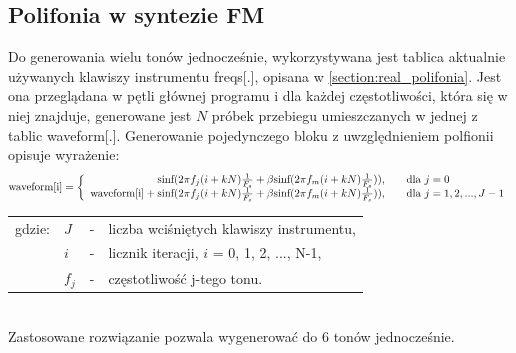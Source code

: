 \subsection{Polifonia w syntezie FM}
Do generowania wielu tonów jednocześnie, wykorzystywana jest tablica aktualnie używanych klawiszy instrumentu freqs[.], opisana w \ref{section:real_polifonia}. Jest ona przeglądana w pętli głównej programu i dla każdej częstotliwości, która się w niej znajduje, generowane jest $N$ próbek przebiegu umieszczanych w jednej z tablic waveform[.]. Generowanie pojedynczego bloku z uwzględnieniem polfionii opisuje wyrażenie:
\begin{equation} \label{equ:fm_wzor4}
\text{waveform[i]} =\left \{\begin{array}{ r l }
\text{sinf}(2\pi f_j(i+kN)\frac{1}{F_s} + \beta \text{sinf}(2 \pi f_m(i+kN)\frac{1}{F_s})), & \quad \text{dla } j = 0\\
\text{waveform[i]} + \text{sinf}(2\pi f_j(i+kN)\frac{1}{F_s} + \beta \text{sinf}(2 \pi f_m(i+kN)\frac{1}{F_s})), & \quad  \text{dla } j = 1, 2, ..., J-1
\end{array}
\right.
\end{equation}
\begin{tabular}{ l l l l}
	gdzie: & $J$ &  - & liczba wciśniętych klawiszy instrumentu, \\
		&	$i$ & - & licznik iteracji, $i$ = 0, 1, 2, ..., N-1,\\
		&	$f_j$ & - & częstotliwość j-tego tonu.\\
\end{tabular} \\

Zastosowane rozwiązanie pozwala wygenerować do 6 tonów jednocześnie. 

